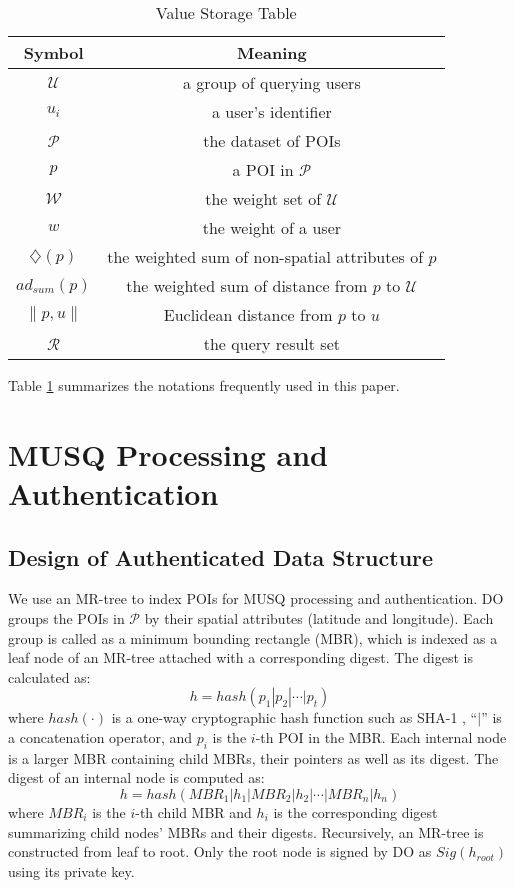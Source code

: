 \documentclass[10pt, conference, compsocconf]{IEEEtran}
\begin{document}
\begin{table}
    \begin{center}\scriptsize
        \begin{tabular}{c | c}
            \hline
            Symbol & Meaning \\
			\hline
			$\mathcal{U}$ & a group of querying users \\
			$u_i$ & a user's identifier \\
			$\mathcal{P}$ & the dataset of POIs \\
			$p$ & a POI in $\mathcal{P}$\\
			$\mathcal{W}$ & the weight set of $\mathcal{U}$\\	
			$w$ & the weight of a user\\	
			$\diamondsuit(p)$ & the weighted sum of non-spatial attributes of $p$ \\
			$ad_{sum}(p)$ & the weighted sum of distance from $p$ to $\mathcal{U}$ \\		
			$\| p,u \|$ & Euclidean distance from $p$ to $u$\\
			$\mathcal{R}$ & the query result set\\
			\hline
		\end{tabular}
	\end{center}
	\caption{Value Storage Table}\label{Symbol}
\end{table}

Table \ref{Symbol} summarizes the notations frequently used in this paper.


\section{MUSQ Processing and Authentication}\label{basic}

\subsection{Design of Authenticated Data Structure}

We use an MR-tree to index POIs for MUSQ processing and authentication. DO groups the POIs in  $\mathcal{P}$ by their spatial attributes (latitude and longitude). Each group is called as a minimum bounding rectangle (MBR), which is indexed as a leaf node of an MR-tree attached with a corresponding digest. The digest is calculated as:
\begin{equation*}
    h = hash(p_1 | p_2 | \cdots | p_t)
\end{equation*}
where $hash(\cdot)$ is a one-way cryptographic hash function such as SHA-1 \cite{SHA1}, ``$|$'' is a concatenation operator, and $p_i$ is the $i$-th POI in the MBR. Each internal node is a larger MBR containing child MBRs, their pointers as well as its digest. The digest of an internal node is computed as:
\begin{equation*}
    h = hash(MBR_1 | h_1 | MBR_2 | h_2 | \cdots | MBR_n | h_n)
\end{equation*}
where $MBR_i$ is the $i$-th child MBR and $h_i$ is the corresponding digest summarizing child nodes' MBRs and their digests. Recursively, an MR-tree is constructed from leaf to root. Only the root node is signed by DO as $Sig(h_{root})$ using its private key.
\end{document}
